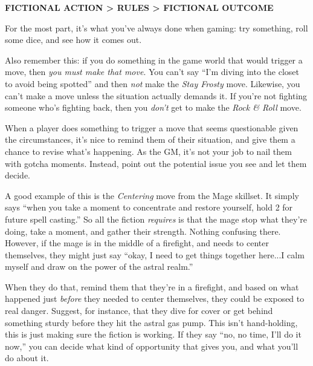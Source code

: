 \documentclass[oneside,10pt]{article}
\begin{document}
\begin{multicols}{2}
\vspace{.1cm}
\begin{adjustwidth*}{1em}{0em}
{\orbitronfont \textbf{FICTIONAL ACTION > RULES > FICTIONAL OUTCOME}}
\end{adjustwidth*}
\vspace{.1cm}

For the most part, it’s what you’ve always done when gaming: try
something, roll some dice, and see how it comes out.


Also remember this: if you do something in the game world that would
trigger a move, then \textit{you must make that move}.  You can’t say
``I’m diving into the closet to avoid being spotted'' and then
\textit{not} make the \textit{Stay Frosty} move. Likewise, you can’t
make a move unless the situation actually demands it.  If you’re not
fighting someone who’s fighting back, then you \textit{don’t} get to
make the \textit{Rock \& Roll} move.

\begin{gmtip}
  When a player does something to trigger a move that seems
  questionable given the circumstances, it’s nice to remind them of
  their situation, and give them a chance to revise what’s
  happening. As the GM, it’s not your job to nail them with gotcha
  moments. Instead, point out the potential issue you see and let
  them decide.
  
  A good example of this is the \textit{Centering}
  move from the Mage skillset. It simply says ``when you take a
  moment to concentrate and restore yourself, hold 2 for future
  spell casting.'' So all the fiction \textit{requires} is that the
  mage stop what they’re doing, take a moment, and gather their
  strength. Nothing confusing there.  However, if the mage is in the
  middle of a firefight, and needs to center themselves, they might
  just say ``okay, I need to get things together here...I calm myself
  and draw on the power of the astral realm.''
    
  When they do that, remind them that they’re in a firefight, and
  based on what happened just \textit{before} they needed to center
  themselves, they could be exposed to real danger. Suggest, for
  instance, that they dive for cover or get behind something sturdy
  before they hit the astral gas pump. This isn’t hand-holding, this
  is just making sure the fiction is working. If they say ``no, no
  time, I’ll do it now,'' you can decide what kind of opportunity
  that gives you, and what you’ll do about it.%
\end{gmtip}


\end{multicols}
\end{document}
